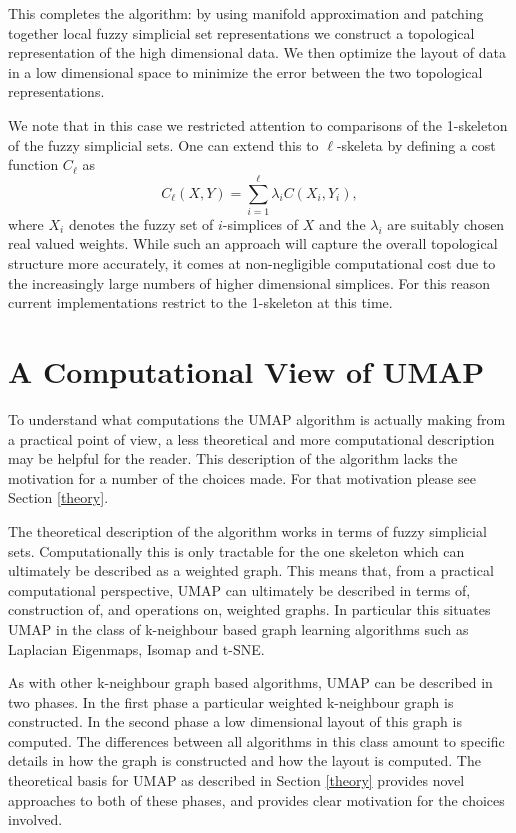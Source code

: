 \documentclass[12pt]{article}
\begin{document}
This completes the algorithm: by using manifold approximation and patching together local fuzzy simplicial set representations we construct a topological representation of the high dimensional data. We then optimize the layout of data in a low dimensional space to minimize the error between the two topological representations.

We note that in this case we restricted attention to comparisons of the 1-skeleton of the fuzzy simplicial sets. One can extend this to $\ell$-skeleta by defining a cost function $C_\ell$ as 
\[
C_\ell(X, Y) = \sum_{i=1}^\ell \lambda_i C(X_i, Y_i),
\]
where $X_i$ denotes the fuzzy set of $i$-simplices of $X$ and the $\lambda_i$ are suitably chosen real valued weights. While such an approach will capture the overall topological structure more accurately, it comes at non-negligible computational cost due to the increasingly large numbers of higher dimensional simplices. For this reason current implementations restrict to the 1-skeleton at this time.

\section{A Computational View of UMAP}\label{computational}

To understand what computations the UMAP algorithm is actually making from a practical point of view, a less theoretical and more computational description may be helpful for the reader.  This description of the algorithm lacks the motivation for a number of the choices made.  For that motivation please see Section \ref{theory}.

The theoretical description of the algorithm works in terms of fuzzy simplicial sets.  Computationally this is only tractable for the one skeleton which can ultimately be described as a weighted graph.  This means that, from a practical computational perspective, UMAP can ultimately be described in terms of, construction of, and operations on, weighted graphs.  In particular this situates UMAP in the class of k-neighbour based graph learning algorithms such as Laplacian Eigenmaps, Isomap and t-SNE.

As with other k-neighbour graph based algorithms, UMAP can be described in two phases.  In the first phase a particular weighted k-neighbour graph is constructed.  In the second phase a low dimensional layout of this graph is computed.  The differences between all algorithms in this class amount to specific details in how the graph is constructed and how the layout is computed.  The theoretical basis for UMAP as described in Section \ref{theory} provides novel approaches to both of these phases, and provides clear motivation for the choices involved.  
\end{document}
